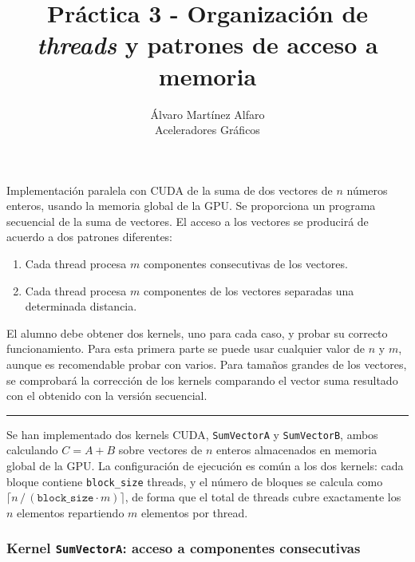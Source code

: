 \documentclass[12pt]{article}
\newenvironment{exercise}[2][Ejercicio]{\begin{trivlist}
\item[\hskip \labelsep {\bfseries #1}\hskip \labelsep {\bfseries #2.}]}{\end{trivlist}}
\begin{document}

\title{Práctica 3 - Organización de \textit{threads} y patrones de acceso a memoria}
\author{Álvaro Martínez Alfaro\\
    Aceleradores Gráficos}

\maketitle

\begin{exercise}{1}
    Implementación paralela con CUDA de la suma de dos vectores de $n$ números enteros, usando la
    memoria global de la GPU. Se proporciona un programa secuencial de la suma de vectores. El
    acceso a los vectores se producirá de acuerdo a dos patrones diferentes:
    \begin{enumerate}[label=\alph*)]
        \item Cada thread procesa $m$ componentes consecutivas de los vectores.
        \item Cada thread procesa $m$ componentes de los vectores separadas una determinada
              distancia.
    \end{enumerate}
    El alumno debe obtener dos kernels, uno para cada caso, y probar su correcto funcionamiento.
    Para esta primera parte se puede usar cualquier valor de $n$ y $m$, aunque es recomendable
    probar con varios. Para tamaños grandes de los vectores, se comprobará la corrección de los
    kernels comparando el vector suma resultado con el obtenido con la versión secuencial.

    \begin{center}
        \noindent\rule{4cm}{0.2pt}
    \end{center}

    Se han implementado dos kernels CUDA, \texttt{SumVectorA} y \texttt{SumVectorB}, ambos
    calculando $C = A + B$ sobre vectores de $n$ enteros almacenados en memoria global de la GPU.
    La configuración de ejecución es común a los dos kernels: cada bloque contiene \texttt{block\_size}
    threads, y el número de bloques se calcula como $\lceil n\,/\,(\texttt{block\_size} \cdot m) \rceil$,
    de forma que el total de threads cubre exactamente los $n$ elementos repartiendo $m$ elementos
    por thread.

    \subsubsection*{Kernel \texttt{SumVectorA}: acceso a componentes consecutivas}


\end{exercise}
\end{document}
